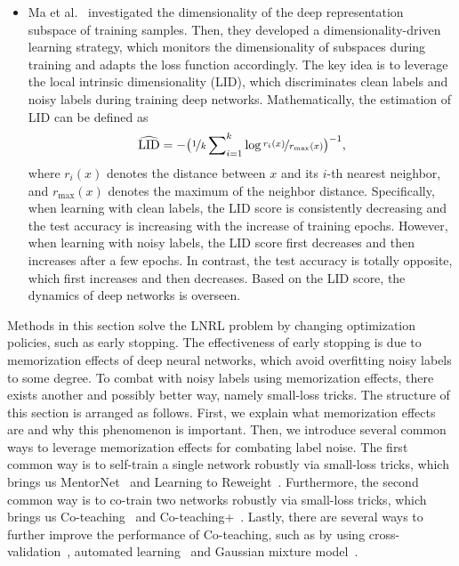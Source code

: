 \begin{itemize}[leftmargin=*]
where $L_0$ is the sample set 
in the beginning. In the self-ensemble strategy, they maintained the two-level ensemble. First, they leveraged the model ensemble with Mean Teacher~, 
namely an exponential running average of model snapshots. Second, they employed a
prediction ensemble by collecting the sample predictions over multiple training
epochs: $\bar{z}_j = \alpha \bar{z}_{j-1} + (1-\alpha)\hat{z}_j$, where
$\bar{z}_j$ depicts the moving-average prediction of sample $k$ at epoch $j$ and
$\hat{z}_j$ is the model prediction for sample $k$ at epoch $j$.
\item
Ma et al.~ 
investigated the dimensionality of the deep representation subspace of training samples. 
Then, they developed a dimensionality-driven learning strategy, 
which monitors the dimensionality of subspaces during training and adapts the loss function accordingly. The key idea is to leverage the local intrinsic dimensionality (LID), which discriminates clean labels and noisy labels during training deep networks.
Mathematically, the estimation of LID can be defined as
\begin{equation}
\widehat{\text{LID}} 
= -
\big( \nicefrac{1}{k}\sum\nolimits_{i=1}^k\log\nicefrac{r_i(x)}{r_{\max}(x)}\big)^{-1},
\end{equation}
where $r_i(x)$ denotes the distance between $x$ and its $i$-th nearest neighbor, and $r_{\max}(x)$ denotes the maximum of the neighbor distance. Specifically, when learning with clean labels, the LID score is consistently decreasing and the test accuracy is increasing with the increase of training epochs. However, when learning with noisy labels, the LID score first decreases and then increases after a few epochs. In contrast, the test accuracy is totally opposite, which first increases and then decreases. Based on the LID score, the dynamics of deep networks is overseen.
\end{itemize}

\label{sec:opt}
Methods in this section solve the LNRL problem by changing optimization policies, such as early stopping. The effectiveness of early stopping is due to memorization effects of deep neural networks, which avoid overfitting noisy labels to some degree. To combat with noisy labels using memorization effects, there exists another and possibly better way, namely small-loss tricks.
The structure of this section is arranged as follows. First, we explain what 
memorization effects are and why this phenomenon is important. Then, we introduce
several common ways to leverage  memorization effects for combating label
noise. The first common way is to self-train a single network robustly via
small-loss tricks, which brings us MentorNet~ and Learning to
Reweight~. Furthermore, the second common way is to co-train two
networks robustly via small-loss tricks, which brings us Co-teaching~ and Co-teaching+~. Lastly, there are several ways to
further improve the performance of Co-teaching, such as by using cross-validation~,
automated learning~ and   Gaussian mixture model~.

